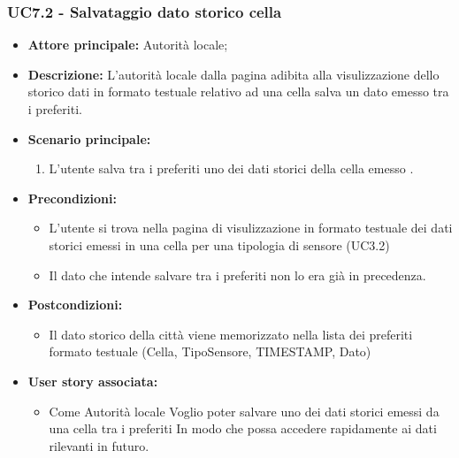 \documentclass{article}
\begin{document}
\subsubsection{UC7.2 - Salvataggio dato storico cella}
\begin{itemize}
    \item \textbf{Attore principale:} Autorità locale;
    \item \textbf{Descrizione:} L’autorità locale dalla pagina adibita alla visulizzazione dello storico dati in formato testuale relativo ad una cella salva un dato emesso tra i preferiti.
    \item \textbf{Scenario principale:}
          \begin{enumerate}
              \item L'utente salva tra i preferiti uno dei dati storici della cella emesso .
          \end{enumerate}
    \item \textbf{Precondizioni:}
          \begin{itemize}
              \item  L'utente si trova nella pagina di visulizzazione in formato testuale dei dati storici emessi in una cella per una tipologia di sensore (UC3.2)
              \item  Il dato che intende salvare tra i preferiti non lo era già in precedenza.
          \end{itemize}
    \item \textbf{Postcondizioni:}
          \begin{itemize}
              \item  Il dato storico della città viene memorizzato nella lista dei preferiti formato testuale (Cella,
                    TipoSensore, TIMESTAMP,
                    Dato)
          \end{itemize}
    \item \textbf{User story associata:}
          \begin{itemize}
              \item Come Autorità locale
                    Voglio poter salvare uno dei dati storici emessi da una cella tra i preferiti
                    In modo che possa accedere rapidamente ai dati rilevanti in futuro.
          \end{itemize}
\end{itemize}

\end{document}

